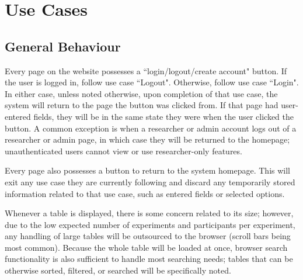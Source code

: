 \section{Use Cases}
\subsection{General Behaviour}
Every page on the website possesses a ``login/logout/create account" button.  If the user is logged in, follow use case ``Logout".  Otherwise, follow use case ``Login".  In either case, unless noted otherwise, upon completion of that use case, the system will return to the page the button was clicked from.  If that page had user-entered fields, they will be in the same state they were when the user clicked the button.  A common exception is when a researcher or admin account logs out of a researcher or admin page, in which case they will be returned to the homepage; unauthenticated users cannot view or use researcher-only features.

Every page also possesses a button to return to the system homepage.  This will exit any use case they are currently following and discard any temporarily stored information related to that use case, such as entered fields or selected options.

Whenever a table is displayed, there is some concern related to its size; however, due to the low expected number of experiments and participants per experiment, any handling of large tables will be outsourced to the browser (scroll bars being most common).  Because the whole table will be loaded at once, browser search functionality is also sufficient to handle most searching needs; tables that can be otherwise sorted, filtered, or searched will be specifically noted.

